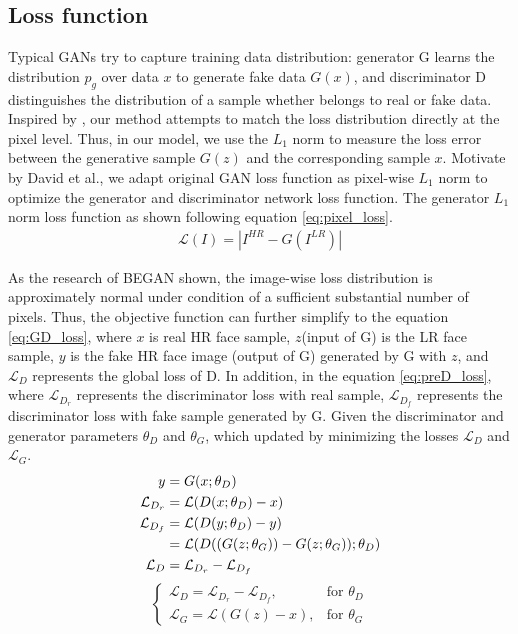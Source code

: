 \documentclass[conference,compsoc]{IEEEtran}
\begin{document}
\subsection{Loss function}

Typical GANs try to capture training data distribution\cite{Goodfellow2014GAN}: generator G learns the distribution $p_g$ over data $x$ to generate fake data $G(x)$, and discriminator D distinguishes the distribution of a sample whether belongs to real or fake data. Inspired by \cite{Arjovsky2017WGAN, zhao2016EBGAN}, our method attempts to match the loss distribution directly at the pixel level. Thus, in our model, we use the $L_1$ norm to measure the loss error between the generative sample $G(z)$ and the corresponding sample $x$. Motivate by David et al.\cite{David-BEGAN2017}, we adapt original GAN\cite{Goodfellow2014GAN} loss function as pixel-wise $L_1$ norm to optimize the generator and discriminator network loss function. The generator $L_1$ norm loss function as shown following equation \ref{eq:pixel_loss}.
\begin{align}\label{eq:pixel_loss}
    \mathcal{L}(I) = |I^{HR}-G(I^{LR})|
\end{align}


As the research of BEGAN\cite{David-BEGAN2017} shown, the image-wise loss distribution is approximately normal under condition of a sufficient substantial number of pixels. Thus, the objective function can further simplify to the equation \ref{eq:GD_loss}, where $x$ is real HR face sample, $z$(input of G) is the LR face sample, $y$ is the fake HR face image (output of G) generated by G with $z$, and $\mathcal{L}_D$ represents the global loss of D. In addition, in the equation \ref{eq:preD_loss}, where $\mathcal{L}_{D_r}$ represents the discriminator loss with real sample, $\mathcal{L}_{D_f}$ represents the discriminator loss with fake sample generated by G. Given the discriminator and generator parameters $\theta_D$ and $\theta_G$, which updated by minimizing the losses $\mathcal{L}_D$ and $\mathcal{L}_G$.
\begin{align}\label{eq:preD_loss}
y & = G(x;\theta_D) \\
\mathcal{L}_{D_r} & = \mathcal{L}(D(x;\theta_D)-x) \\
\mathcal{L}_{D_f} & = \mathcal{L}(D(y;\theta_D)-y) \notag \\
& = \mathcal{L}(D((G(z;\theta_G))-G(z;\theta_G));\theta_D)\\
\mathcal{L}_D & = \mathcal{L}_{D_r} - \mathcal{L}_{D_f}
\end{align}
\begin{equation}\label{eq:GD_loss}
  \begin{cases}
   \mathcal{L}_D = \mathcal{L}_{D_r} - \mathcal{L}_{D_f}, & \text{for } \theta_D \\
   \mathcal{L}_G = \mathcal{L}(G(z)-x), & \text{for } \theta_G
  \end{cases}
\end{equation}
\end{document}
